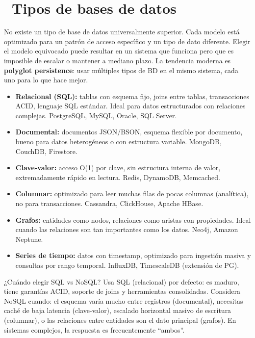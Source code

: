 \section[Tipos de bases de datos]{~Tipos de bases de datos}

No existe un tipo de base de datos universalmente superior. Cada modelo está optimizado para un patrón de acceso específico y un tipo de dato diferente.
Elegir el modelo equivocado puede resultar en un sistema que funciona pero que es imposible de escalar o mantener a mediano plazo.
La tendencia moderna es \textbf{polyglot persistence}: usar múltiples tipos de BD en el mismo sistema, cada uno para lo que hace mejor.

\begin{itemize}
  \item \textbf{Relacional (SQL):} tablas con esquema fijo, joins entre tablas, transacciones ACID, lenguaje SQL estándar. Ideal para datos estructurados con relaciones complejas. PostgreSQL, MySQL, Oracle, SQL Server.
  \item \textbf{Documental:} documentos JSON/BSON, esquema flexible por documento, bueno para datos heterogéneos o con estructura variable. MongoDB, CouchDB, Firestore.
  \item \textbf{Clave-valor:} acceso O(1) por clave, sin estructura interna de valor, extremadamente rápido en lectura. Redis, DynamoDB, Memcached.
  \item \textbf{Columnar:} optimizado para leer muchas filas de pocas columnas (analítica), no para transacciones. Cassandra, ClickHouse, Apache HBase.
  \item \textbf{Grafos:} entidades como nodos, relaciones como aristas con propiedades. Ideal cuando las relaciones son tan importantes como los datos. Neo4j, Amazon Neptune.
  \item \textbf{Series de tiempo:} datos con timestamp, optimizado para ingestión masiva y consultas por rango temporal. InfluxDB, TimescaleDB (extensión de PG).
\end{itemize}

\begin{tipbox}{¿Cuándo elegir SQL vs NoSQL?}
Usa SQL (relacional) por defecto: es maduro, tiene garantías ACID, soporte de joins y herramientas consolidadas.
Considera NoSQL cuando: el esquema varía mucho entre registros (documental), necesitas caché de baja latencia (clave-valor), escalado horizontal masivo de escritura (columnar), o las relaciones entre entidades son el dato principal (grafos).
En sistemas complejos, la respuesta es frecuentemente ``ambos''.
\end{tipbox}

